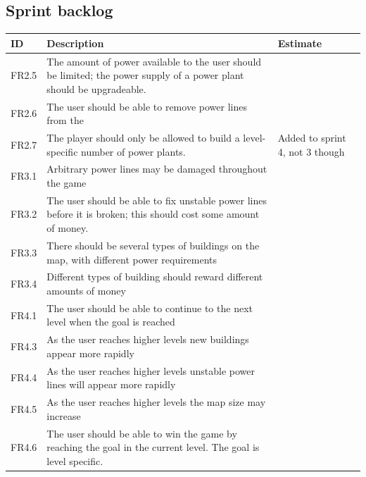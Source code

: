 \clearpage
\subsection{Sprint backlog}

	\begin{tabular}{| p{1.2cm} | p{8cm} | p{3cm} |}
		\hline
		\rowcolor{gray}
		ID & Description & Estimate \\ \hline

		FR2.5 & The amount of power available to the user should be limited; 
		the power supply of a power plant should be upgradeable. & \\ \hline

		FR2.6 & The user should be able to remove power lines from the 
		& \\ \hline

		FR2.7 & The player should only be allowed to build a level-specific 
		number of power plants. & Added to sprint 4, not 3 though \\ \hline

		FR3.1 & Arbitrary power lines may be damaged throughout the game & \\ \hline

		FR3.2 & The user should be able to fix unstable power lines before it is 
		broken; this should cost some amount of money. & \\ \hline

		FR3.3 & There should be several types of buildings on the map, with different 
		power requirements & \\ \hline

		FR3.4 & Different types of building should reward different amounts of 
		money & \\ \hline

		FR4.1 & The user should be able to continue to the next level when the goal is 
		reached & \\ \hline

		FR4.3 & As the user reaches higher levels new buildings appear more 
		rapidly & \\ \hline

		FR4.4 & As the user reaches higher levels unstable power lines will appear 
		more rapidly & \\ \hline

		FR4.5 & As the user reaches higher levels the map size may increase & \\ \hline

		FR4.6 & The user should be able to win the game by reaching the goal in 
		the current level. The goal is level specific. & \\ \hline


\end{tabular}
